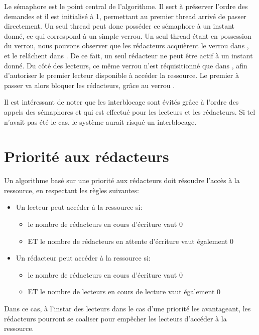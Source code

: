Le sémaphore  est le point central de l'algorithme. Il sert à préserver l'ordre des demandes et il est initialisé à 1, permettant au premier thread arrivé de passer directement. Un seul thread peut donc posséder ce sémaphore à un instant donné, ce qui correspond à un simple verrou. Un seul thread étant en possession du verrou, nous pouvons observer que les rédacteurs acquièrent le verrou dans , et le relâchent dans . De ce fait, un seul rédacteur ne peut être actif à un instant donné. Du côté des lecteurs, ce même verrou n'est réquisitionné que dans , afin d'autoriser le premier lecteur disponible à accéder la ressource. Le premier à passer va alors bloquer les rédacteurs, grâce au verrou .

Il est intéressant de noter que les interblocage sont évités grâce
à l'ordre des appels des sémaphores  et  qui est effectué pour les lecteurs et les rédacteurs.
Si tel n'avait pas été le cas, le système aurait risqué un interblocage.

\section{Priorité aux rédacteurs}
Un algorithme basé sur une priorité aux rédacteurs doit résoudre l'accès à la ressource, en respectant les règles suivantes:
\begin{itemize}
\item Un lecteur peut accéder à la ressource si:
\begin{itemize}
\item le nombre de rédacteurs en cours d'écriture vaut 0
\item ET le nombre de rédacteurs en attente d'écriture vaut également 0
\end{itemize}
\item Un rédacteur peut accéder à la ressource si:
\begin{itemize}
\item le nombre de rédacteurs en cours d'écriture vaut 0
\item ET le nombre de lecteurs en cours de lecture vaut également 0
\end{itemize}
\end{itemize}

Dans ce cas, à l'instar des lecteurs dans le cas d'une priorité les avantageant, les rédacteurs pourront se coaliser pour empêcher les lecteurs d'accéder à la ressource.

